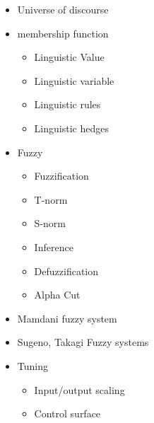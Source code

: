 \documentclass[a4paper,11pt]{article}
\begin{document}
\begin{itemize}
\begin{itemize}
\begin{itemize}
                    \item Universe of discourse
                    \item membership function
                        \begin{itemize}
                            \item Linguistic Value
                            \item Linguistic variable
                            \item Linguistic rules
                            \item Linguistic hedges
                        \end{itemize}
                    \item Fuzzy
                        \begin{itemize}
                            \item Fuzzification 
                            \item T-norm
                            \item S-norm
                            \item Inference
                            \item Defuzzification
                            \item Alpha Cut
                                
                        \end{itemize}
                    \item Mamdani fuzzy system
                    \item Sugeno, Takagi Fuzzy systems
                    \item Tuning
                        \begin{itemize}
                            \item Input/output scaling
                            \item Control surface
                        \end{itemize}
                \end{itemize}
        \end{itemize}
        
\end{itemize}
\end{document}
